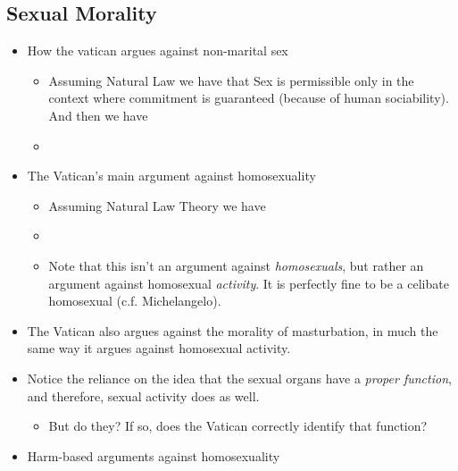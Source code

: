 \documentclass{article}
\begin{document}
\begin{spacing}{1.2}
    \newpage
    \section{Sexual Morality}
    \begin{itemize}
        \item How the vatican argues against non-marital sex
              \begin{itemize}
                  \item Assuming Natural Law we have that Sex is permissible only in the context where commitment is guaranteed (because of human sociability). And then we have
                  \item {}
              \end{itemize}
        \item The Vatican's main argument against homosexuality
              \begin{itemize}
                  \item Assuming Natural Law Theory we have
                  \item {}
                  \item Note that this isn't an argument against \emph{homosexuals}, but rather an argument against homosexual \emph{activity}. It is perfectly fine to be a celibate homosexual (c.f. Michelangelo).
              \end{itemize}
        \item The Vatican also argues against the morality of masturbation, in much the same way it argues against homosexual activity.
        \item Notice the reliance on the idea that the sexual organs have a \emph{proper function}, and therefore, sexual activity does as well.
        \begin{itemize}
            \item But do they? If so, does the Vatican correctly identify that function?
        \end{itemize}
        \item Harm-based arguments against homosexuality

\end{itemize}
\end{spacing}
\end{document}
